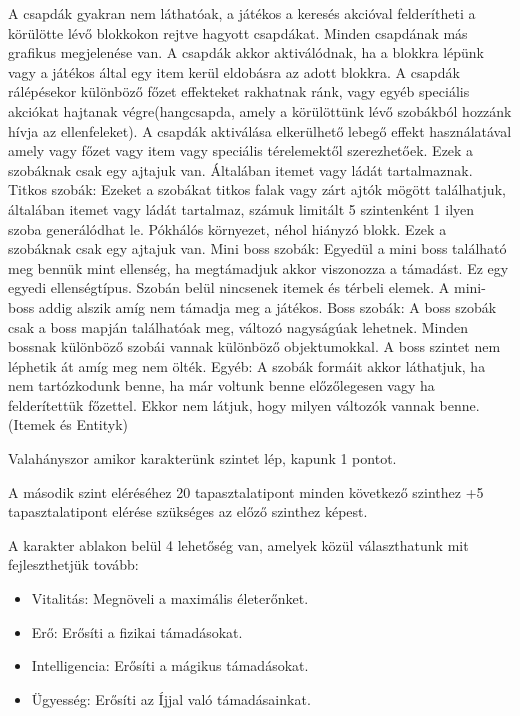A csapdák gyakran nem láthatóak, a játékos a keresés akcióval felderítheti a körülötte lévő blokkokon rejtve hagyott csapdákat.
Minden csapdának más grafikus megjelenése van.
A csapdák akkor aktiválódnak, ha a blokkra lépünk vagy a játékos által egy item kerül eldobásra az adott blokkra.
A csapdák rálépésekor különböző főzet effekteket rakhatnak ránk, vagy egyéb speciális akciókat hajtanak végre(hangcsapda, amely a körülöttünk lévő szobákból hozzánk hívja az ellenfeleket).
A csapdák aktiválása elkerülhető lebegő effekt használatával amely vagy főzet vagy item vagy speciális térelemektől szerezhetőek. Ezek a szobáknak csak egy ajtajuk van. Általában itemet vagy ládát tartalmaznak.
Titkos szobák:
Ezeket a szobákat titkos falak vagy zárt ajtók mögött találhatjuk, általában itemet vagy ládát tartalmaz, számuk limitált 5 szintenként 1 ilyen szoba generálódhat le. Pókhálós környezet, néhol hiányzó blokk. Ezek a szobáknak csak egy ajtajuk van.
Mini boss szobák:
Egyedül a mini boss található meg bennük mint ellenség, ha megtámadjuk akkor viszonozza a támadást. Ez egy egyedi ellenségtípus. Szobán belül nincsenek itemek és térbeli elemek.
A mini-boss addig alszik amíg nem támadja meg a játékos.
Boss szobák:
A boss szobák csak a boss mapján találhatóak meg, változó nagyságúak lehetnek.
Minden bossnak különböző szobái vannak különböző objektumokkal.
A boss szintet nem léphetik át amíg meg nem ölték.
Egyéb:
A szobák formáit akkor láthatjuk, ha nem tartózkodunk benne, ha már voltunk benne előzőlegesen vagy ha felderítettük főzettel. Ekkor nem látjuk, hogy milyen változók vannak benne. (Itemek és Entityk)


Valahányszor amikor karakterünk szintet lép, kapunk 1 pontot.

A második szint eléréséhez 20 tapasztalatipont minden következő szinthez +5 tapasztalatipont elérése szükséges az előző szinthez képest.

A karakter ablakon belül 4 lehetőség van, amelyek közül választhatunk mit fejleszthetjük tovább:
\begin{itemize}
    \item Vitalitás: Megnöveli a maximális életerőnket.
    \item Erő: Erősíti a fizikai támadásokat.
    \item Intelligencia: Erősíti a mágikus támadásokat.
    \item Ügyesség: Erősíti az Íjjal való támadásainkat.
\end{itemize}

